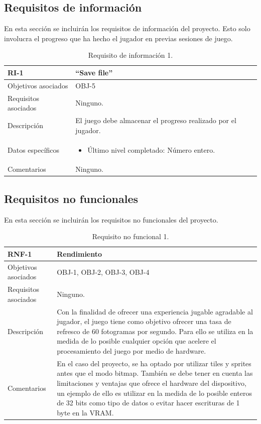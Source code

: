 \subsection{Requisitos de información}
En esta sección se incluirán los requisitos de información del proyecto. Esto solo involucra el progreso que ha hecho el jugador en previas sesiones de juego.

\vspace{2cm}

\begin{table}[h]
	\centering
	\begin{tabular}{| l | p{11cm} |}
		\hline
		\textbf{RI-1} & \textbf{``Save file''} \\ \hline
		Objetivos asociados & OBJ-5 \\ \hline
		Requisitos asociados & Ninguno. \\ \hline
		Descripción & El juego debe almacenar el progreso realizado por el jugador. \\ \hline
		Datos específicos & 
		\begin{itemize}
			\item Último nivel completado: Número entero.
		\end{itemize}
		\\ \hline
		Comentarios & Ninguno. \\ \hline
	\end{tabular}
	\caption{Requisito de información 1.}\label{tab:ri-1}
\end{table}
\FloatBarrier{}
\newpage
\subsection{Requisitos no funcionales}
En esta sección se incluirán los requisitos no funcionales del proyecto.

\vspace{2cm}

\begin{table}[h]
	\centering
	\begin{tabular}{| l | p{11cm} |}
		\hline
		\textbf{RNF-1} & \textbf{Rendimiento} \\ \hline
		Objetivos asociados & OBJ-1, OBJ-2, OBJ-3, OBJ-4 \\ \hline
		Requisitos asociados & Ninguno. \\ \hline
		Descripción & Con la finalidad de ofrecer una experiencia jugable agradable al jugador, el juego tiene como objetivo ofrecer una tasa de refresco de 60 fotogramas por segundo. Para ello se utiliza en la medida de lo posible cualquier opción que acelere el procesamiento del juego por medio de hardware. \\ \hline
		Comentarios & En el caso del proyecto, se ha optado por utilizar tiles y sprites antes que el modo bitmap. También se debe tener en cuenta las limitaciones y ventajas que ofrece el hardware del dispositivo, un ejemplo de ello es utilizar en la medida de lo posible enteros de 32 bits como tipo de datos o evitar hacer escrituras de 1 byte en la VRAM. \\ \hline
	\end{tabular}
	\caption{Requisito no funcional 1.}\label{tab:rnf-1}
\end{table}

